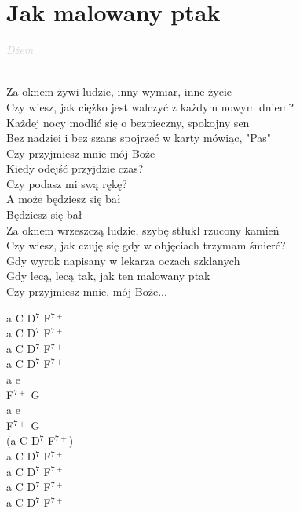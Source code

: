 \documentclass[a5paper, 10pt]{book}
\begin{document}
\section{Jak malowany ptak}\textcolor{lightgray}{\textit{Dżem}}\\~\\
\begin{minipage}[t]{0.8\textwidth}
Za oknem żywi ludzie, inny wymiar, inne życie\\
Czy wiesz, jak ciężko jest walczyć z każdym nowym dniem?\\
Każdej nocy modlić się o bezpieczny, spokojny sen\\
Bez nadziei i bez szans spojrzeć w karty mówiąc, "Pas"\\

\hspace*{5mm}Czy przyjmiesz mnie mój Boże\\
\hspace*{5mm}Kiedy odejść przyjdzie czas?\\
\hspace*{5mm}Czy podasz mi swą rękę?\\
\hspace*{5mm}A może będziesz się bał\\
\hspace*{5mm}Będziesz się bał\\

Za oknem wrzeszczą ludzie, szybę stłukł rzucony kamień\\
Czy wiesz, jak czuję się gdy w objęciach trzymam śmierć?\\
Gdy wyrok napisany w lekarza oczach szklanych\\
Gdy lecą, lecą tak, jak ten malowany ptak\\

Czy przyjmiesz mnie, mój Boże...\\

\end{minipage}
\begin{minipage}[t]{0.2\textwidth}
a C D$^7$ F$^{7+}$\\
a C D$^7$ F$^{7+}$\\
a C D$^7$ F$^{7+}$\\
a C D$^7$ F$^{7+}$\\

a e\\
F$^{7+}$ G\\
a e\\
F$^{7+}$ G\\
(a C D$^7$ F$^{7+}$)\\

a C D$^7$ F$^{7+}$\\
a C D$^7$ F$^{7+}$\\
a C D$^7$ F$^{7+}$\\
a C D$^7$ F$^{7+}$\\
\end{minipage}
\end{document}

